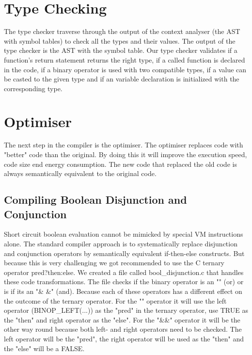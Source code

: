 \documentclass{uva-inf-article}
\begin{document}
\newpage
\section{Type Checking}
The type checker traverse through the output of the context analyser (the AST with symbol tables) 
to check all the types and their values. The output of the type checker is the AST with the symbol table.
Our type checker validates if a function's return statement returns the right type, 
if a called function is declared in the code, if a binary operator is used with two compatible types, 
if a value can be casted to the given type and if an variable declaration is initialized with the corresponding type.

\section{Optimiser}
The next step in the compiler is the optimiser. The optimiser replaces code with "better" code
than the original. By doing this it will improve the execution speed, code size end energy
consumption. The new code that replaced the old code is always semantically equivalent to the 
original code.

\subsection{Compiling Boolean Disjunction and Conjunction}
Short circuit boolean evaluation cannot be mimicked by special VM instructions alone. The standard 
compiler approach is to systematically replace disjunction and conjunction operators by semantically 
equivalent if-then-else constructs. But because this is very challenging we got recommended to use the
C ternary operator pred?then:else. We created a file called bool\_disjunction.c that handles these 
code transformations. The file checks if the binary operator is an "\textbar \textbar" (or) or is if its an "\& \&" (and).
Because each of these operators has a different effect on the outcome of the ternary operator. For 
the "\textbar \textbar" operator it will use the left operator (BINOP\_LEFT(...)) as the "pred" in the ternary operator,
use TRUE as the "then" and right operator as the "else". For the "\&\&" operator it will be the other way 
round because both left- and right operators need to be checked. The left operator will be the "pred",
the right operator will be used as the "then" and the "else" will be a FALSE.

\end{document}
